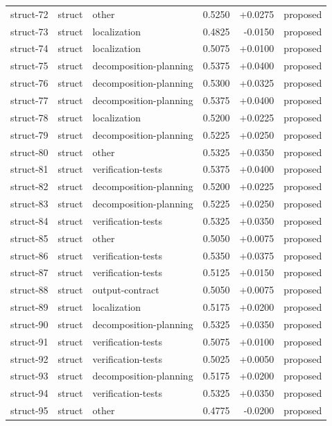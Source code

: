 \begin{center}
\begin{longtable}{llp{5.2cm}rrl}
struct-72 & struct & other & 0.5250 & +0.0275 & proposed \\
struct-73 & struct & localization & 0.4825 & -0.0150 & proposed \\
struct-74 & struct & localization & 0.5075 & +0.0100 & proposed \\
struct-75 & struct & decomposition-planning & 0.5375 & +0.0400 & proposed \\
struct-76 & struct & decomposition-planning & 0.5300 & +0.0325 & proposed \\
struct-77 & struct & decomposition-planning & 0.5375 & +0.0400 & proposed \\
struct-78 & struct & localization & 0.5200 & +0.0225 & proposed \\
struct-79 & struct & decomposition-planning & 0.5225 & +0.0250 & proposed \\
struct-80 & struct & other & 0.5325 & +0.0350 & proposed \\
struct-81 & struct & verification-tests & 0.5375 & +0.0400 & proposed \\
struct-82 & struct & decomposition-planning & 0.5200 & +0.0225 & proposed \\
struct-83 & struct & decomposition-planning & 0.5225 & +0.0250 & proposed \\
struct-84 & struct & verification-tests & 0.5325 & +0.0350 & proposed \\
struct-85 & struct & other & 0.5050 & +0.0075 & proposed \\
struct-86 & struct & verification-tests & 0.5350 & +0.0375 & proposed \\
struct-87 & struct & verification-tests & 0.5125 & +0.0150 & proposed \\
struct-88 & struct & output-contract & 0.5050 & +0.0075 & proposed \\
struct-89 & struct & localization & 0.5175 & +0.0200 & proposed \\
struct-90 & struct & decomposition-planning & 0.5325 & +0.0350 & proposed \\
struct-91 & struct & verification-tests & 0.5075 & +0.0100 & proposed \\
struct-92 & struct & verification-tests & 0.5025 & +0.0050 & proposed \\
struct-93 & struct & decomposition-planning & 0.5175 & +0.0200 & proposed \\
struct-94 & struct & verification-tests & 0.5325 & +0.0350 & proposed \\
struct-95 & struct & other & 0.4775 & -0.0200 & proposed \\

\end{longtable}
\end{center}
